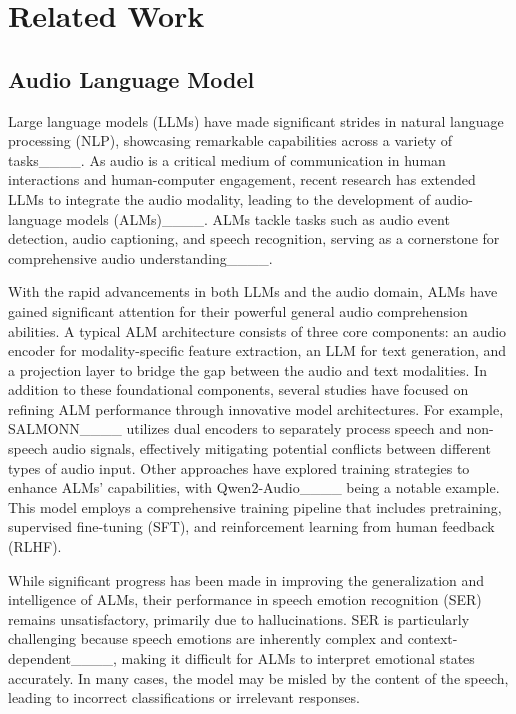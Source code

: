 \section{Related Work}
\subsection{Audio Language Model}

Large language models (LLMs) have made significant strides in natural language processing (NLP), showcasing remarkable capabilities across a variety of tasks____. As audio is a critical medium of communication in human interactions and human-computer engagement, recent research has extended LLMs to integrate the audio modality, leading to the development of audio-language models (ALMs)____. ALMs tackle tasks such as audio event detection, audio captioning, and speech recognition, serving as a cornerstone for comprehensive audio understanding____.

With the rapid advancements in both LLMs and the audio domain, ALMs have gained significant attention for their powerful general audio comprehension abilities. A typical ALM architecture consists of three core components: an audio encoder for modality-specific feature extraction, an LLM for text generation, and a projection layer to bridge the gap between the audio and text modalities. In addition to these foundational components, several studies have focused on refining ALM performance through innovative model architectures. For example, SALMONN____ utilizes dual encoders to separately process speech and non-speech audio signals, effectively mitigating potential conflicts between different types of audio input. Other approaches have explored training strategies to enhance ALMs' capabilities, with Qwen2-Audio____ being a notable example. This model employs a comprehensive training pipeline that includes pretraining, supervised fine-tuning (SFT), and reinforcement learning from human feedback (RLHF).

While significant progress has been made in improving the generalization and intelligence of ALMs, their performance in speech emotion recognition (SER) remains unsatisfactory, primarily due to hallucinations. SER is particularly challenging because speech emotions are inherently complex and context-dependent____, making it difficult for ALMs to interpret emotional states accurately. In many cases, the model may be misled by the content of the speech, leading to incorrect classifications or irrelevant responses.

